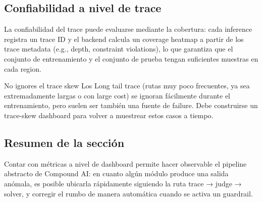 \subsection{Confiabilidad a nivel de trace}

La confiabilidad del trace puede evaluarse mediante la cobertura: cada inference registra un trace ID y el backend calcula un coverage heatmap a partir de los trace metadata (e.g., depth, constraint violations), lo que garantiza que el conjunto de entrenamiento y el conjunto de prueba tengan suficientes muestras en cada region.

\begin{warningbox}{No ignores el trace skew}
Los Long tail trace (rutas muy poco frecuentes, ya sea extremadamente largas o con large cost) se ignoran fácilmente durante el entrenamiento, pero suelen ser también una fuente de failure. Debe construirse un trace-skew dashboard para volver a muestrear estos casos a tiempo.
\end{warningbox}

\subsection{Resumen de la sección}

Contar con métricas a nivel de dashboard permite hacer observable el pipeline abstracto de Compound AI: en cuanto algún módulo produce una salida anómala, es posible ubicarla rápidamente siguiendo la ruta trace → judge → solver, y corregir el rumbo de manera automática cuando se activa un guardrail.
